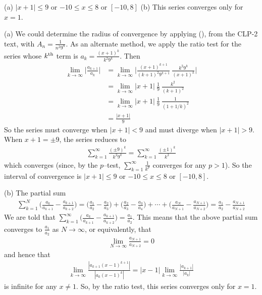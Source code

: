 \begin{answer}
(a)  $|x+1|\le 9$ or $-10\le x\le 8$ or $[-10,8]$
\qquad (b) This series converges only for $x=1$.
\end{answer}

\begin{solution} (a)
We could determine the radius of convergence by applying (), 
from the CLP-2 text, with  $A_n = \frac{1}{n^2 9^n}$. As an alternate method, 
we apply the ratio test for the series whose $k^{\rm th}$
term is $a_k=\frac{(x+1)^k}{k^2 9^k}$. Then
\begin{align*}
\lim_{k\rightarrow\infty}\bigg|\frac{a_{k+1}}{a_k}\bigg|
&=\lim_{k\rightarrow\infty} \bigg|\frac{(x+1)^{k+1}}{(k+1)^2 9^{k+1}}
                                  \ \frac{k^2 9^k}{(x+1)^k}\bigg| \\
&=\lim_{k\rightarrow\infty} |x+1|\ \frac{1}{9}\ \frac{k^2}{(k+1)^2} \\
&=\lim_{k\rightarrow\infty} |x+1|\ \frac{1}{9}\ \frac{1}{(1+1/k)^2} \\
&=\frac{|x+1|}{9}
\end{align*}
So the series must converge when $|x+1|<9$ and must diverge when $|x+1|>9$.
When $x+1=\pm 9$, the series reduces to
\begin{align*}
\sum_{k=1}^\infty \frac{(\pm 9)^k}{k^2 9^k}
=\sum_{k=1}^\infty \frac{(\pm 1)^k}{k^2}
\end{align*}
which converges (since, by the $p$--test, $\sum_{k=1}^\infty\frac{1}{k^p}$ converges for
any $p>1$). So the interval of convergence is $|x+1|\le 9$
or $-10\le x\le 8$  or $[-10,8]$.



\noindent (b)
The partial sum
\begin{align*}
\sum_{k=1}^N\Big(\frac{a_k}{a_{k+1}}
                         -\frac{a_{k+1}}{a_{k+2}}\Big)
=\Big(\frac{a_1}{a_2}-\frac{a_2}{a_3}\Big)
 +\Big(\frac{a_2}{a_3}-\frac{a_3}{a_4}\Big)
+\cdots+ \Big(\frac{a_N}{a_{N+1}}-\frac{a_{N+1}}{a_{N+2}}\Big)
=\frac{a_1}{a_2}-\frac{a_{N+1}}{a_{N+2}}
\end{align*}
We are told that ${\displaystyle \sum_{k=1}^\infty \Big(\frac{a_k}{a_{k+1}}
                         -\frac{a_{k+1}}{a_{k+2}}\Big)
   =\frac{a_1}{a_2} }$. This means that the above partial sum converges to
$\frac{a_1}{a_2}$ as $N\rightarrow\infty$, or equivalently, that
\begin{align*}
\lim_{N\rightarrow\infty}\frac{a_{N+1}}{a_{N+2}}=0
\end{align*}
and hence that
\begin{align*}
\lim_{k\rightarrow\infty}\frac{|a_{k+1}(x-1)^{k+1}|}{|a_k(x-1)^k|}
=|x-1|\lim_{k\rightarrow\infty}\frac{|a_{k+1}|}{|a_k|}
\end{align*}
is infinite for any $x\ne 1$. So, by the ratio test, this series converges only for $x=1$.
\end{solution}


